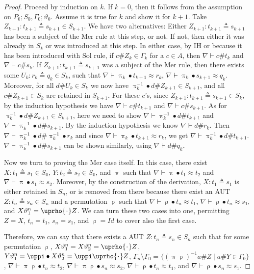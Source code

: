 \documentclass{llncs}
\newcommand{\id}{\mathit{Id}}
\newcommand{\permap}{{\mkern 1mu\cdot \mkern 1mu}}
\newcommand{\permef}{\bullet}
\newcommand\ppi{\uppi}
\newcommand\prho{\uprho}
\begin{document}
\begin{proof}
Proceed by induction on $k$. If $k=0$, then it follows from the
assumption on $P_0;S_0,\Gamma_0;\vartheta_0$. Assume it is true for
$k$ and show it for $k+1$. Take $Z_{k+1}:t_{k+1}\triangleq s_{k+1} \in
S_{k+1}$. We have two alternatives: Either $Z_{k+1}:t_{k+1}\triangleq
s_{k+1}$ has been a subject of the {\sf Mer} rule at this step, or
not. If not, then either it was already in $S_k$ or was introduced at
this step. In either case, by IH or because it has been
  introduced with {\sf Sol} rule, if $c\#Z_k\in \Gamma_k$ for a $c\in
A$, then $\nabla \vdash c\# t_k$ and $\nabla \vdash c\# s_k$. If
$Z_{k+1}:t_{k+1}\triangleq s_{k+1}$ was a subject of the {\sf Mer}
rule, then there exists some $U_k:r_k \triangleq q_k \in S_k$, such
that $\nabla \vdash \ppi_k\permef t_{k+1} \approx r_k$, $\nabla \vdash
\ppi_k\permef s_{k+1} \approx q_k$. Moreover, for all $d\# U_k \in S_k$ we now have
$\ppi_k^{-1}\permef d \# Z_{k+1} \in S_{k+1}$, and all $c\# Z_{k+1}
\in S_k$ are retained in $S_{k+1}$. For these $c$'s, since
$Z_{k+1}:t_{k+1}\triangleq s_{k+1} \in S_k$, by the induction
hypothesis we have $\nabla \vdash c\# t_{k+1}$ and $\nabla \vdash c\#
s_{k+1}$. As for $\ppi_k^{-1}\permef d \# Z_{k+1} \in S_{k+1}$, here
we need to show $\nabla \vdash \ppi_k^{-1}\permef d \# t_{k+1}$ and
$\nabla \vdash \ppi_k^{-1}\permef d \# s_{k+1}$. By the induction
hypothesis we know $\nabla\vdash d\# r_k$. Then $\nabla\vdash
\ppi_k^{-1}\permef d\# \ppi_k^{-1}\permef r_k$ and since $\nabla
\vdash \ppi_k\permef t_{k+1} \approx r_k$, we get $\nabla \vdash
\ppi_k^{-1}\permef d \# t_{k+1}$. $\nabla \vdash \ppi_k^{-1}\permef d
\# s_{k+1}$ can be shown similarly, using $\nabla\vdash d\# q_k$.

Now we turn to proving the {\sf Mer} case itself. In this case, there exist $X:t_1 \triangleq s_1\in S_0$, $Y:t_2
\triangleq s_2\in S_0$, and $\ppi$ such that $\nabla\vdash \ppi\permef
t_1 \approx t_2$ and $\nabla\vdash \ppi\permef s_1 \approx
s_2$. Moreover, by the construction of the derivation, $X:t_1
\triangleq s_1$ is either retained in $S_n$, or is removed from
there because there exist an AUT $Z:t_n\triangleq s_n\in S_n$ and a
permutation $\prho$ such that $\nabla \vdash \prho \permef t_n \approx
t_1$, $\nabla \vdash \prho \permef t_n \approx s_1$, and
$X\vartheta_1^n = \prho\permap Z $. We can turn these two cases into
one, permitting $Z=X$, $t_n=t_1$, $s_n=s_1$, and $\prho = \id$ to
cover also the first case.



Therefore, we can say that there exists a AUT $Z:t_n\triangleq s_n\in
S_n$ such that for some permutation $\prho$, $X\vartheta_1^n=
X\vartheta_2^n= \prho\permap Z$, $Y\vartheta_1^n= \ppi\permef
X\vartheta_2^n = \ppi \prho \permap Z$, $\Gamma_n\setminus
\Gamma_0=\{(\ppi \prho)^{-1}a\# Z \mid a\# Y\in \Gamma_0\}$,
$\nabla\vdash \ppi \prho \permef t_n\approx t_2$, $\nabla\vdash
\ppi\prho \permef s_n\approx s_2$, $\nabla \vdash \prho
\permef t_n \approx t_1$, and $\nabla \vdash \prho \permef s_n \approx
s_1$.






\end{proof}
\end{document}
